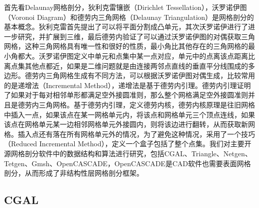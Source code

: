 首先看Delaunay网格剖分，狄利克雷镶嵌（Dirichlet Tessellation），沃罗诺伊图（Voronoi Diagram）和德劳内三角网格（Delaunay Triangulation）是网格剖分的基本概念。狄利克雷首先提出了可以将平面分割成凸单元，其次沃罗诺伊进行了进一步研究，并扩展到三维，最后德劳内验证了可以通过沃罗诺伊图的对偶获取三角网格，这种三角网格具有唯一性和很好的性质，最小角比其他存在的三角网格的最小角都大。沃罗诺伊图定义中单元和点集中某一点对应，单元中的点离该点距离比离点集其他点都近，如果是二维问题就是由连接两邻点直线的垂直平分线围成的多边形。德劳内三角网格生成有不同方法，可以根据沃罗诺伊图对偶生成，比较常用的是递增法（Incremental Method），递增法是基于德劳内引理。德劳内引理证明了如果对于每对相邻单形都满足空外接圆准则，那么整个网格满足空外接圆准则并且是德劳内三角网格。基于德劳内引理，定义德劳内核，德劳内核原理是往旧网格中插入一点，如果该点在某一网格单元内，将该点和网格单元三个顶点连线，如果该点在网格单元某一边相邻网格单元外接圆内，则将该边进行翻转，从而获取新网格。插入点还有落在所有网格单元外的情况，为了避免这种情况，采用了一个技巧（Reduced Incremental Method），定义一个盒子包括了整个点集。我们对主要开源网格剖分软件中的数据结构和算法进行研究，包括CGAL、Triangle、Netgen、Tetgen、Gmsh、OpenCASCADE，OpenCASCADE是CAD软件也需要表面网格剖分，从而形成了非结构性层网格剖分框架。

\subsection{CGAL}

